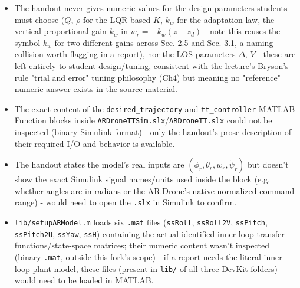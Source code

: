 \documentclass[11pt]{article}
\begin{document}
\begin{itemize}
\item The handout never gives numeric values for the design parameters students must choose ($Q$, $\rho$ for the LQR-based $K$, $k_w$ for the adaptation law, the vertical proportional gain $k_w$ in $w_r=-k_w(z-z_d)$ - note this reuses the symbol $k_w$ for two different gains across Sec. 2.5 and Sec. 3.1, a naming collision worth flagging in a report), nor the LOS parameters $\Delta$, $V$ - these are left entirely to student design/tuning, consistent with the lecture's Bryson's-rule "trial and error" tuning philosophy (Ch4) but meaning no "reference" numeric answer exists in the source material.
\item The exact content of the \texttt{desired\_\allowbreak{}trajectory} and \texttt{tt\_\allowbreak{}controller} MATLAB Function blocks inside \texttt{ARDroneTTSim.slx}/\texttt{ARDroneTT.slx} could not be inspected (binary Simulink format) - only the handout's prose description of their required I/O and behavior is available.
\item The handout states the model's real inputs are $(\phi_r, \theta_r, w_r, \dot\psi_r)$ but doesn't show the exact Simulink signal names/units used inside the block (e.g. whether angles are in radians or the AR.Drone's native normalized command range) - would need to open the \texttt{.slx} in Simulink to confirm.
\item \texttt{lib/\allowbreak{}setupARModel.m} loads six \texttt{.mat} files (\texttt{ssRoll}, \texttt{ssRoll2V}, \texttt{ssPitch}, \texttt{ssPitch2U}, \texttt{ssYaw}, \texttt{ssH}) containing the actual identified inner-loop transfer functions/state-space matrices; their numeric content wasn't inspected (binary \texttt{.mat}, outside this fork's scope) - if a report needs the literal inner-loop plant model, these files (present in \texttt{lib/} of all three DevKit folders) would need to be loaded in MATLAB.
\end{itemize}
\end{document}
